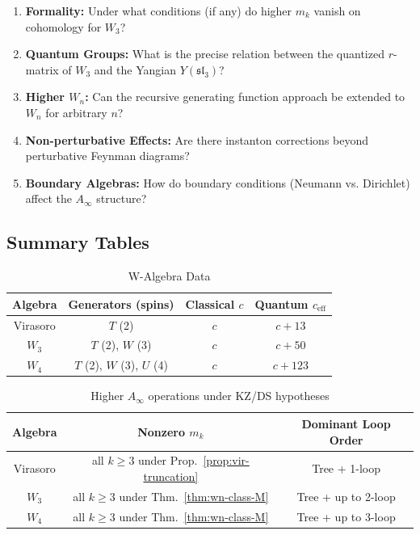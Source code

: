 \begin{enumerate}
\item \textbf{Formality:} Under what conditions (if any) do higher $m_k$ vanish on cohomology for $W_3$?

\item \textbf{Quantum Groups:} What is the precise relation between the quantized $r$-matrix of $W_3$ and the Yangian $Y(\mathfrak{sl}_3)$?

\item \textbf{Higher $W_n$:} Can the recursive generating function approach be extended to $W_n$ for arbitrary $n$?

\item \textbf{Non-perturbative Effects:} Are there instanton corrections beyond perturbative Feynman diagrams?

\item \textbf{Boundary Algebras:} How do boundary conditions (Neumann vs. Dirichlet) affect the $A_\infty$ structure?
\end{enumerate}

\subsection{Summary Tables}

\begin{table}[h]
\centering
\caption{W-Algebra Data}
\begin{tabular}{|c|c|c|c|}
\hline
Algebra & Generators (spins) & Classical $c$ & Quantum $c_{\text{eff}}$ \\
\hline
Virasoro & $T$ (2) & $c$ & $c + 13$ \\
$W_3$ & $T$ (2), $W$ (3) & $c$ & $c + 50$ \\
$W_4$ & $T$ (2), $W$ (3), $U$ (4) & $c$ & $c + 123$ \\
\hline
\end{tabular}
\end{table}

\begin{table}[h]
\centering
\caption{Higher $A_\infty$ operations under KZ/DS hypotheses}
\begin{tabular}{|c|c|c|}
\hline
Algebra & Nonzero $m_k$ & Dominant Loop Order \\
\hline
Virasoro & all $k \geq 3$ under Prop.~\ref{prop:vir-truncation} & Tree + 1-loop \\
$W_3$ & all $k \geq 3$ under Thm.~\ref{thm:wn-class-M} & Tree + up to 2-loop \\
$W_4$ & all $k \geq 3$ under Thm.~\ref{thm:wn-class-M} & Tree + up to 3-loop \\
\hline
\end{tabular}
\end{table}

